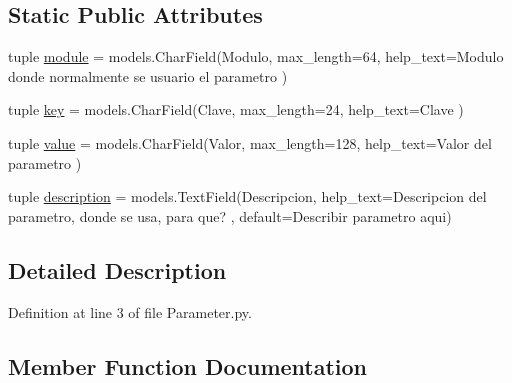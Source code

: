\subsection*{Static Public Attributes}
\begin{DoxyCompactItemize}
\item 
tuple \hyperlink{class_ground_segment_1_1models_1_1_parameter_1_1_parameter_a880b8fa5882db5b609d5e31c71a12791}{module} = models.\+Char\+Field(\textquotesingle{}Modulo\textquotesingle{}, max\+\_\+length=64, help\+\_\+text=\textquotesingle{}Modulo donde normalmente se usuario el parametro\textquotesingle{} )
\item 
tuple \hyperlink{class_ground_segment_1_1models_1_1_parameter_1_1_parameter_adb452d16d2b26aa423a928b243cf8a18}{key} = models.\+Char\+Field(\textquotesingle{}Clave\textquotesingle{}, max\+\_\+length=24, help\+\_\+text=\textquotesingle{}Clave\textquotesingle{} )
\item 
tuple \hyperlink{class_ground_segment_1_1models_1_1_parameter_1_1_parameter_a7186899b0882d6b4134ca24ed6f2bbc8}{value} = models.\+Char\+Field(\textquotesingle{}Valor\textquotesingle{}, max\+\_\+length=128, help\+\_\+text=\textquotesingle{}Valor del parametro\textquotesingle{} )
\item 
tuple \hyperlink{class_ground_segment_1_1models_1_1_parameter_1_1_parameter_a685979e7244995a427107dcd31ce55ff}{description} = models.\+Text\+Field(\textquotesingle{}Descripcion\textquotesingle{}, help\+\_\+text=\textquotesingle{}Descripcion del parametro, donde se usa, para que?\textquotesingle{} , default=\textquotesingle{}Describir parametro aqui\textquotesingle{})
\end{DoxyCompactItemize}


\subsection{Detailed Description}


Definition at line 3 of file Parameter.\+py.



\subsection{Member Function Documentation}
\hypertarget{class_ground_segment_1_1models_1_1_parameter_1_1_parameter_a98a8c7d5a16cb7e6bf0148b39dbe2bfe}{}
